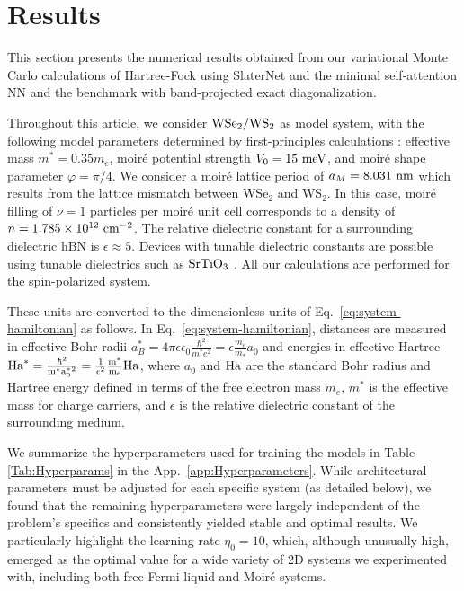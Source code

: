 \documentclass[
 reprint,
 amsmath,amssymb,
 aps, prx,
floatfix,longbibliography,
]{revtex4-2}
\begin{document}
\section{Results}
\label{sec:results}

This section presents the numerical results obtained from our variational Monte Carlo calculations of Hartree-Fock using SlaterNet and the minimal self-attention NN and the benchmark with band-projected exact diagonalization. 
 
Throughout this article, we consider ${\rm WSe}_2 / {\rm WS}_2$ as model system, with the following model parameters determined by first-principles calculations \cite{mott2}: effective mass $m^* = 0.35 m_e$, moir\'e potential strength $V_0 = 15\ {\rm meV}$, and moir\'e shape parameter $\varphi = \pi / 4$. We consider a moir\'e lattice period of $a_M = 8.031 \ {\rm nm}$ which results from the lattice mismatch between WSe$_2$ and WS$_2$. %
In this case, moir\'e filling of $\nu = 1$ particles per moir\'e unit cell corresponds to a density of $n = 1.785 \times 10^{12} \ {\rm cm}^{-2}$. The relative dielectric constant for a surrounding dielectric hBN is $\epsilon \approx 5$. Devices with tunable dielectric constants are possible using tunable dielectrics such as ${\rm Sr}{\rm Ti}{\rm O}_3$ \cite{Fuchs1999May}. All our calculations are performed for the spin-polarized system. 

These units are converted to the dimensionless units of Eq.~\eqref{eq:system-hamiltonian} as follows. In Eq.~\eqref{eq:system-hamiltonian}, distances are measured in effective Bohr radii $a^*_{B} = 4\pi\epsilon\epsilon_{0}\frac{\hbar^{2}}{m^{*}e^{2}} = \epsilon \frac{m_e}{m_*} a_0$ and energies in effective Hartree $\rm{Ha}^* = \frac{\hbar^{2}}{m^{*}{a_0^*}^{2}} = \frac{1}{\epsilon^2}\frac{m^*}{m_e} \rm{Ha}$, where $a_0$ and ${\rm Ha}$ are the standard Bohr radius and Hartree energy defined in terms of the free electron mass $m_e$, $m^*$ is the effective mass for charge carriers, and $\epsilon$ is the relative dielectric constant of the surrounding medium. 

We summarize the hyperparameters used for training the models in Table \ref{Tab:Hyperparams} in the App.~\ref{app:Hyperparameters}. While architectural parameters must be adjusted for each specific system (as detailed below), we found that the remaining hyperparameters were largely independent of the problem's specifics and consistently yielded stable and optimal results. We particularly highlight the learning rate $\eta_0 = 10$, which, although unusually high, emerged as the optimal value for a wide variety of 2D systems we experimented with, including both free Fermi liquid and Moiré systems.
\end{document}
